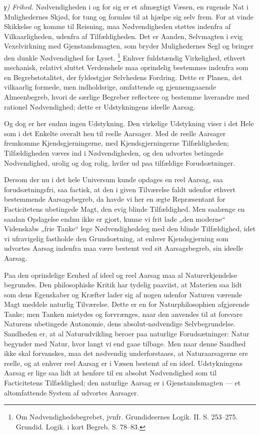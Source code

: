 \documentclass[12pt,a4paper]{book}
\renewcommand{\thefootnote}{*)}
\newcommand{\subrunin}[1]{\emph{#1}\hspace{0.4em}}
\begin{document}
\subrunin{γ) Frihed.} Nødvendigheden i og for sig er et afmægtigt
Væsen, en rugende Nat i Mulighedernes Skjød, for tung og formløs til at
hjælpe sig selv frem. For at vinde Skikkelse og komme til Reisning, maa
Nødvendigheden støttes indenfra af Vilkaarligheden, udenfra af
Tilfældigheden. Det er Aanden, Selvmagten i evig Vexelvirkning med
Gjenstandsmagten, som bryder Mulighedernes Segl og bringer den dunkle
Nødvendighed for Lyset.%
\renewcommand{\thefootnote}{**)}%
\footnote{%
Om Nødvendighedsbegrebet, jvnfr. Grundideernes Logik. II. S.
253--275. Grundid. Logik. i kort Begreb. S. 78--83.}%
\renewcommand{\thefootnote}{*)}
Enhver fuldstændig Virkelighed, ethvert mechanisk, relativt sluttet
Verdenshele maa oprindelig bestemmes indenfra som en Begrebstotalitet,
der fyldestgjør Selvhedens Fordring. Dette er Planen, det vilkaarlig
formede, men indholdsrige, omfattende og gjennemgaaende Almeenbegreb,
hvori de særlige Begreber reflectere og bestemme hverandre med rationel
Nødvendighed; dette er Udstykningens ideelle Aarsag.

Og dog er her endnu ingen Udstykning. Den virkelige Udstykning viser i
det Hele som i det Enkelte overalt hen til reelle Aarsager. Med de
reelle Aarsager fremkomme Kjendsgjerningerne, med Kjendsgjerningerne
Tilfældigheden; Tilfældigheden væves ind i Nødvendigheden, og den
udvortes betingede Nødvendighed, urolig og dog rolig, hviler ud paa
tilfældige Forudsætninger.

Dersom der nu i det hele Universum kunde opdages en reel Aarsag, saa
forudsætningsfri, saa factisk, at den i given Tilværelse faldt udenfor
ethvert bestemmende Aarsagsbegreb, da havde vi her en ægte Repræsentant
for Facticitetens ubetingede Magt, den evig blinde Tilfældighed. Men
saalænge en saadan Opdagelse endnu ikke er gjort, kunne vi frit lade
„den moderne“ Videnskabs „frie Tanke“ lege Nødvendighedsleg med den
blinde Tilfældighed, idet vi ufravigelig fastholde den Grundsætning, at
enhver Kjendsgjerning som udvortes Aarsag indenfra maa være bestemt ved
sit Aarsagsbegreb, sin ideelle Aarsag.

Paa den oprindelige Eenhed af ideel og reel Aarsag maa al
Naturerkjendelse begrundes. Den philosophiske Kritik har tydelig
paaviist, at Materien saa lidt som dens Egenskaber og Kræfter lader sig
af nogen udenfor Naturen værende Magt meddele naturlig Tilværelse.
Dette er en for Naturphilosophien afgjørende Tanke; men Tanken mistydes
og forvrænges, naar den anvendes til at forsvare Naturens ubetingede
Autonomie, dens absolut-nødvendige Selvbegrundelse. Sandheden er, at al
Naturudvikling beroer paa naturlige Forudsætninger: Natur begynder med
Natur, hvor langt vi end gaae tilbage. Men naar denne Sandhed ikke
skal forvanskes, maa det nødvendig underforstaaes, at Naturaarsagerne
ere reelle, og at enhver reel Aarsag er i Væsen bestemt af en ideel.
Udstykningens Aarsag er lige saa lidt at henføre til en absolut
Nødvendighed som til Facticitetens Tilfældighed; den naturlige Aarsag
er i Gjenstandsmagten --- et altomfattende System af udvortes
Aarsager.
\end{document}
